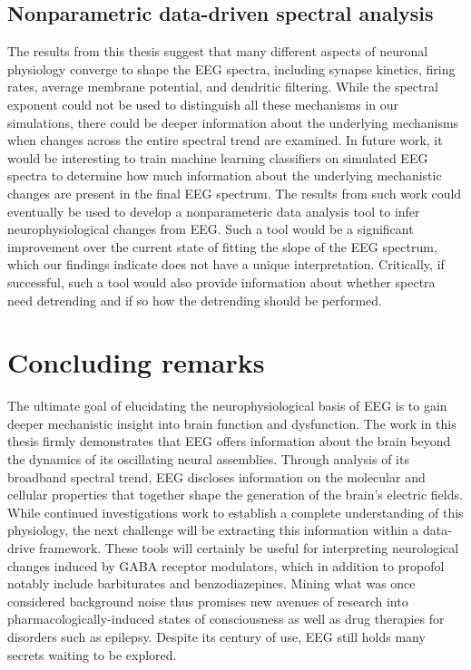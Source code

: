 \subsection{Nonparametric data-driven spectral analysis}
The results from this thesis suggest that many different aspects of neuronal physiology converge to shape the EEG spectra, including synapse kinetics, firing rates, average membrane potential, and dendritic filtering. While the spectral exponent could not be used to distinguish all these mechanisms in our simulations, there could be deeper information about the underlying mechanisms when changes across the entire spectral trend are examined. In future work, it would be interesting to train machine learning classifiers on simulated EEG spectra to determine how much information about the underlying mechanistic changes are present in the final EEG spectrum. The results from such work could eventually be used to develop a nonparameteric data analysis tool to infer neurophysiological changes from EEG. Such a tool would be a significant improvement over the current state of fitting the slope of the EEG spectrum, which our findings indicate does not have a unique interpretation. Critically, if successful, such a tool would also provide information about whether spectra need detrending and if so how the detrending should be performed.

\section{Concluding remarks}
The ultimate goal of elucidating the neurophysiological basis of EEG is to gain deeper mechanistic insight into brain function and dysfunction. The work in this thesis firmly demonstrates that EEG offers information about the brain beyond the dynamics of its oscillating neural assemblies. Through analysis of its broadband spectral trend, EEG discloses information on the molecular and cellular properties that together shape the generation of the brain's electric fields. While continued investigations work to establish a complete understanding of this physiology, the next challenge will be extracting this information within a data-drive framework. These tools will certainly be useful for interpreting neurological changes induced by GABA receptor modulators, which in addition to propofol notably include barbiturates and benzodiazepines. Mining what was once considered background noise thus promises new avenues of research into pharmacologically-induced states of consciousness as well as drug therapies for disorders such as epilepsy. Despite its century of use, EEG still holds many secrets waiting to be explored.